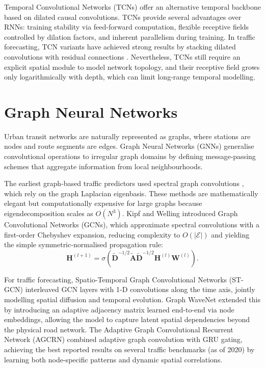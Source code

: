 Temporal Convolutional Networks (TCNs) \cite{bai2018empirical} offer an alternative temporal backbone based on dilated causal convolutions. TCNs provide several advantages over RNNs: training stability via feed-forward computation, flexible receptive fields controlled by dilation factors, and inherent parallelism during training. In traffic forecasting, TCN variants have achieved strong results by stacking dilated convolutions with residual connections \cite{zhang2021deep}. Nevertheless, TCNs still require an explicit spatial module to model network topology, and their receptive field grows only logarithmically with depth, which can limit long-range temporal modelling.

\section{Graph Neural Networks}
\label{sec:gnn}

Urban transit networks are naturally represented as graphs, where stations are nodes and route segments are edges. Graph Neural Networks (GNNs) generalise convolutional operations to irregular graph domains by defining message-passing schemes that aggregate information from local neighbourhoods.

The earliest graph-based traffic predictors used spectral graph convolutions \cite{bruna2014spectral,defferrard2016convolutional}, which rely on the graph Laplacian eigenbasis. These methods are mathematically elegant but computationally expensive for large graphs because eigendecomposition scales as $O(N^3)$. Kipf and Welling \cite{kipf2017semi} introduced Graph Convolutional Networks (GCNs), which approximate spectral convolutions with a first-order Chebyshev expansion, reducing complexity to $O(|\mathcal{E}|)$ and yielding the simple symmetric-normalised propagation rule:
\begin{equation}
    \mathbf{H}^{(l+1)} = \sigma\left(\tilde{\mathbf{D}}^{-1/2} \tilde{\mathbf{A}} \tilde{\mathbf{D}}^{-1/2} \mathbf{H}^{(l)} \mathbf{W}^{(l)}\right).
    \label{eq:gcn}
\end{equation}

For traffic forecasting, Spatio-Temporal Graph Convolutional Networks (ST-GCN) \cite{yu2018stgcn} interleaved GCN layers with 1-D convolutions along the time axis, jointly modelling spatial diffusion and temporal evolution. Graph WaveNet \cite{wu2019graphwavenet} extended this by introducing an adaptive adjacency matrix learned end-to-end via node embeddings, allowing the model to capture latent spatial dependencies beyond the physical road network. The Adaptive Graph Convolutional Recurrent Network (AGCRN) \cite{bai2020adaptive} combined adaptive graph convolution with GRU gating, achieving the best reported results on several traffic benchmarks (as of 2020) by learning both node-specific patterns and dynamic spatial correlations.


